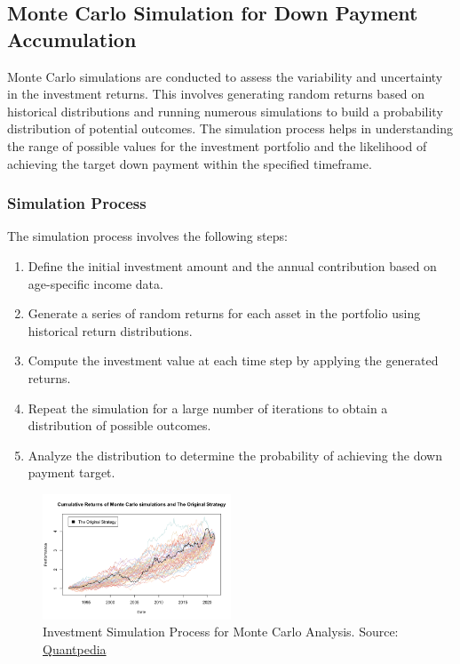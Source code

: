 \subsection{Monte Carlo Simulation for Down Payment Accumulation}
Monte Carlo simulations are conducted to assess the variability and uncertainty in the investment returns. This involves generating random returns based on historical distributions and running numerous simulations to build a probability distribution of potential outcomes. The simulation process helps in understanding the range of possible values for the investment portfolio and the likelihood of achieving the target down payment within the specified timeframe.

\subsubsection{Simulation Process}
The simulation process involves the following steps:
\begin{enumerate}
    \item Define the initial investment amount and the annual contribution based on age-specific income data.
    \item Generate a series of random returns for each asset in the portfolio using historical return distributions.
    \item Compute the investment value at each time step by applying the generated returns.
    \item Repeat the simulation for a large number of iterations to obtain a distribution of possible outcomes.
    \item Analyze the distribution to determine the probability of achieving the down payment target.
\end{enumerate}

\begin{figure}[h]
\centering
\includegraphics[width=0.5\textwidth]{investment_simulation_process.png}
\caption{Investment Simulation Process for Monte Carlo Analysis. Source: \href{https://quantpedia.com/introduction-and-examples-of-monte-carlo-strategy-simulation/}{Quantpedia}}
\label{fig:simulation_process}
\end{figure}

